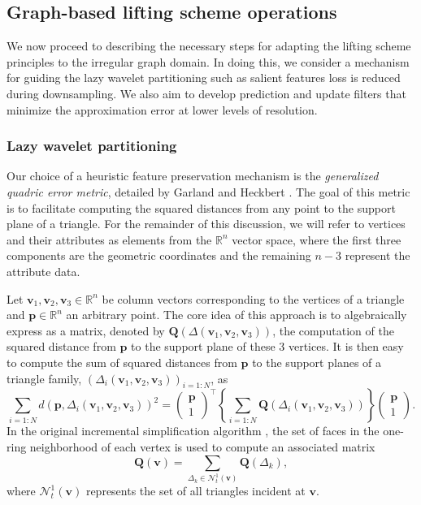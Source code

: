\documentclass[graybox]{svmult}
\begin{document}
	\subsection{Graph-based lifting scheme operations}
	We now proceed to describing the necessary steps for adapting the lifting scheme principles to the irregular graph domain. In doing this, we consider a mechanism for guiding the lazy wavelet partitioning such as salient features loss is reduced during downsampling. We also aim to develop prediction and update filters that minimize the approximation error at lower levels of resolution.
	
	\subsubsection{Lazy wavelet partitioning}
	Our choice of a heuristic feature preservation mechanism is the
	\emph{generalized quadric error metric}, detailed by Garland and Heckbert \cite{Garland1998}. The goal of this metric is to facilitate computing the squared distances from any point to the support plane of a triangle. For the remainder of this discussion, we will refer to vertices and their attributes as elements from the $\mathbb{R}^n$ vector space, where the first three components are the geometric coordinates and the remaining $n-3$ represent the attribute data.
	
	
	Let $\mathbf{v}_1, \mathbf{v}_2, \mathbf{v}_3 \in \mathbb{R}^n$ be column vectors corresponding to the vertices of a triangle and $\mathbf{p} \in \mathbb{R}^n$  an arbitrary point.
	The core idea of this approach is to algebraically express as a matrix, denoted by $\mathbf{Q}(\Delta(\mathbf{v}_1, \mathbf{v}_2, \mathbf{v}_3))$, the computation of the squared distance from  $\mathbf{p}$ to the support plane of these 3 vertices. It is then easy to compute the sum of squared distances from $\mathbf{p}$ to  the support planes of a triangle family, $\left( \Delta_i(\mathbf{v}_{1}, \mathbf{v}_{2}, \mathbf{v}_{3}) \right)_{i={1:N}}$, as
	\begin{equation}
	\sum\limits_{i={1:N}}{d(\mathbf{p},  \Delta_i(\mathbf{v}_{1}, \mathbf{v}_{2}, \mathbf{v}_{3}) )^2 } = 
	\begin{pmatrix} \mathbf{p} \\ 1 \end{pmatrix}^\intercal \left\{  \sum\limits_{i={1:N}} \mathbf{Q}\left(  \Delta_i(\mathbf{v}_{1}, \mathbf{v}_{2}, \mathbf{v}_{3}) \right) \right\} \begin{pmatrix} \mathbf{p} \\ 1 \end{pmatrix}.
	\label{eq_cds:quadric_addition}
	\end{equation}
	In the original incremental simplification algorithm \cite{Garland1998}, the set of faces in the one-ring neighborhood of each vertex is used to compute an associated matrix
	\begin{equation}
	\mathbf{Q(v)} = \sum\limits_{\Delta_k \in \mathcal{N}_t^1(\mathbf{v})}{ \mathbf{Q}(\Delta_k) },
	\label{eq_cds:vertex_quadric_error_matrix}
	\end{equation} 
	where $\mathcal{N}_t^1(\mathbf{v})$ represents the set of all triangles incident at $\mathbf{v}$.
	
\end{document}
